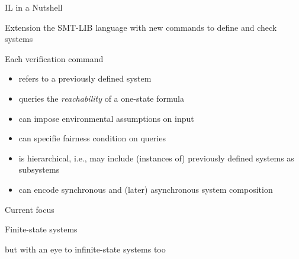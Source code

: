 \documentclass[10pt,aspectratio=149]{beamer}
\begin{document}

\begin{frame}{IL in a Nutshell}

\alert{Extension} the \alert{SMT-LIB} language with \alert{new commands} to define and check systems

\bigskip
\smallskip
\pause

Each \alert{verification command}
\medskip

\begin{itemize}
\item<2,8>
refers to a \alert{previously defined system}
\medskip

\item<3,8>
queries the \emph{reachability} of a one-state formula
\medskip

\item<4,8>
can impose environmental assumptions on input
\medskip

\item<5,8>
can specifie fairness condition on queries
\medskip

\item<6,8>
is \alert{hierarchical}, i.e., may include (instances of) previously defined systems as subsystems 
\medskip

\item<7,8>
can \alert{encode} \alert{synchronous} \alert{and} (later) \alert{asynchronous} system composition
\end{itemize}

\end{frame}


\begin{frame}{Current focus}
\Large
\centering

\alert{Finite-state} systems
\bigskip
\bigskip
\pause

but with an eye to \alert{infinite-state} systems too

\end{frame}

\end{document}
